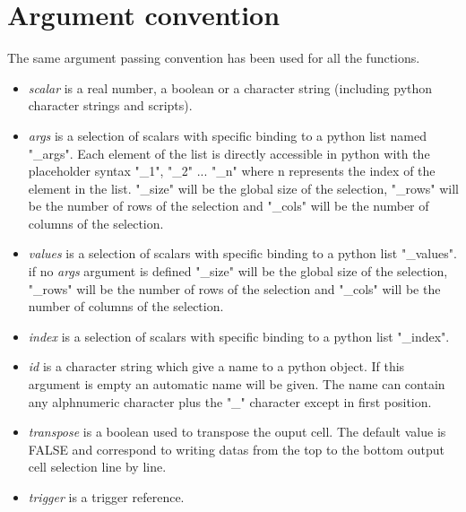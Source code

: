 \section{Argument convention}

The same argument passing convention has been used for all the functions.

\begin{itemize}
\item \textsl{scalar} is a real number, a boolean or a character string (including python character strings and scripts).
\item \textsl{args} is a selection of scalars with specific binding to a python list named "\_args". Each element of the list is directly accessible in python with the placeholder syntax "\_1", "\_2" ... "\_n" where n represents the index of the element in the list. "\_size" will be the global size of the selection, "\_rows" will be the number of rows of the selection and "\_cols" will be the number of columns of the selection.
\item \textsl{values} is a selection of scalars with specific binding to a python list "\_values". \textcolor{mred}{if no \textsl{args} argument is defined} "\_size" will be the global size of the selection, "\_rows" will be the number of rows of the selection and "\_cols" will be the number of columns of the selection. 
\item \textsl{index} is a selection of scalars with specific binding to a python list "\_index". 
\item \textsl{id} is a character string which give a name to a python object. If this argument is empty an automatic name will be given. The name can contain any alphnumeric character plus the "\_" character except in first position.
\item \textsl{transpose} is a boolean used to transpose the ouput cell. The default value is FALSE and correspond to writing datas from the top to the bottom output cell selection line by line.  
\item \textsl{trigger} is a trigger reference. 
\end{itemize}










